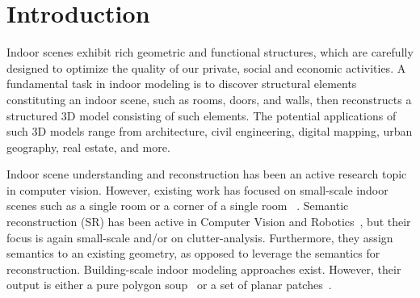 \section{Introduction}

Indoor scenes exhibit rich geometric and functional structures, which
are carefully designed to optimize the quality of our private, social
and economic activities. A fundamental task in indoor modeling is to
discover structural elements constituting an indoor scene, such as
rooms, doors, and walls, then reconstructs a structured 3D model
consisting of such elements.
The potential applications of such 3D models range from architecture,
civil engineering, digital mapping, urban geography, real estate, and
more.

Indoor scene understanding and reconstruction has been an
active research topic in computer vision.
However, existing work has focused on small-scale indoor scenes such as
a single room or a corner of a single room
~\cite{Hoiem13,nyu_12}.  Semantic reconstruction (SR) has been active in Computer Vision and Robotics~\cite{herbst2014toward}, but their focus is again small-scale and/or on clutter-analysis. %
Furthermore, they assign semantics to an existing geometry, as opposed
to leverage the semantics for reconstruction.
%
Building-scale indoor modeling approaches exist. However, their output
is either a pure polygon soup~\cite{eccv_museum} or a set of planar
patches~\cite{xiong2013automatic}.



